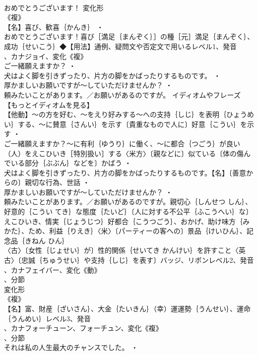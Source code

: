 \documentclass[8pt]{extreport}
\begin{document}
\begin{CJK}{UTF8}{min}
\\	おめでとうございます！	変化形 
\\	《複》
\\	【名】喜び、歓喜｛かんき｝ ・
\\	おめでとうございます！喜び［満足｛まんぞく｝］の種［元］満足｛まんぞく｝、成功｛せいこう｝◆【用法】通例、疑問文や否定文で用いるレベル1、発音
\\	、カナジョイ、変化《複》
\\	ご一緒願えますか？ ・
\\	犬はよく脚を引きずったり、片方の脚をかばったりするものです。 ・
\\	厚かましいお願いですが～していただけませんか？ ・
\\	頼みたいことがあります。／お願いがあるのですが。	イディオムやフレーズ 
\\	【もっとイディオムを見る】
\\	【他動】～の方を好む、～をえり好みする～への支持｛しじ｝を表明｛ひょうめい｝する、～に賛意｛さんい｝を示す〔貴重なもので人に〕好意｛こうい｝を示す ・
\\	ご一緒願えますか？～に有利｛ゆうり｝に働く、～に都合｛つごう｝が良い（人）をえこひいき［特別扱い］する〈米方〉〔親などに〕似ている〔体の傷んでいる部分｛ぶぶん｝などを〕かばう ・
\\	犬はよく脚を引きずったり、片方の脚をかばったりするものです。【名】〔善意からの〕親切な行為、世話 ・
\\	厚かましいお願いですが～していただけませんか？ ・
\\	頼みたいことがあります。／お願いがあるのですが。親切心｛しんせつ しん｝、好意的｛こうい てき｝な態度｛たいど｝〔人に対する不公平｛ふこうへい｝な〕えこひいき、情実｛じょうじつ｝好都合｛こうつごう｝、おかげ、助け味方｛みかた｝、ため、利益｛りえき｝〈米〉〔パーティーの客への〕景品｛けいひん｝、記念品｛きねん ひん｝
\\	〈古〉〔女性｛じょせい｝が〕性的関係｛せいてき かんけい｝を許すこと〈英古〉〔忠誠｛ちゅうせい｝や支持｛しじ｝を表す〕バッジ、リボンレベル2、発音
\\	、カナフェイバー、変化《動》
\\	、分節
\\	変化形 
\\	《複》
\\	【名】富、財産｛ざいさん｝、大金｛たいきん｝（幸）運運勢｛うんせい｝、運命｛うんめい｝レベル3、発音
\\	、カナフォーチューン、フォーチュン、変化《複》
\\	、分節
\\	それは私の人生最大のチャンスでした。 ・

\end{CJK}
\end{document}
